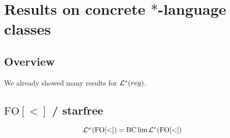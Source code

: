 \section{Results on concrete $*$-language classes}

\subsection{Overview}
We already showed many results for $\mathcal{L}^*(reg)$.

\subsection{$\mathrm{FO[<]}$ / starfree}

\begin{thm}
\[ \mathcal{L}^\omega (\mathrm{FO[<]}) = \operatorname{BC} \lim \mathcal{L}^*(\mathrm{FO[<]}) \]
\end{thm}

